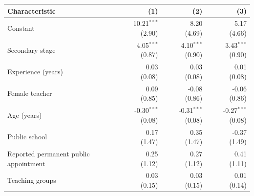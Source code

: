 \begin{tabular}{p{6.5cm}rrr}
\toprule
Characteristic & (1) & (2) & (3) \\
\midrule
Constant & \shortstack{10.21$^{***}$\\{\scriptsize (2.90)}} & \shortstack{8.20\\{\scriptsize (4.69)}} & \shortstack{5.17\\{\scriptsize (4.66)}} \\
Secondary stage & \shortstack{4.05$^{***}$\\{\scriptsize (0.87)}} & \shortstack{4.10$^{***}$\\{\scriptsize (0.90)}} & \shortstack{3.43$^{***}$\\{\scriptsize (0.90)}} \\
Experience (years) & \shortstack{0.03\\{\scriptsize (0.08)}} & \shortstack{0.03\\{\scriptsize (0.08)}} & \shortstack{0.01\\{\scriptsize (0.08)}} \\
Female teacher & \shortstack{0.09\\{\scriptsize (0.85)}} & \shortstack{-0.08\\{\scriptsize (0.86)}} & \shortstack{-0.06\\{\scriptsize (0.86)}} \\
Age (years) & \shortstack{-0.30$^{***}$\\{\scriptsize (0.08)}} & \shortstack{-0.31$^{***}$\\{\scriptsize (0.08)}} & \shortstack{-0.27$^{***}$\\{\scriptsize (0.08)}} \\
Public school & \shortstack{0.17\\{\scriptsize (1.47)}} & \shortstack{0.35\\{\scriptsize (1.47)}} & \shortstack{-0.37\\{\scriptsize (1.49)}} \\
Reported permanent public appointment & \shortstack{0.25\\{\scriptsize (1.12)}} & \shortstack{0.27\\{\scriptsize (1.12)}} & \shortstack{0.41\\{\scriptsize (1.11)}} \\
Teaching groups & \shortstack{0.03\\{\scriptsize (0.15)}} & \shortstack{0.03\\{\scriptsize (0.15)}} & \shortstack{0.01\\{\scriptsize (0.14)}} \\

\end{tabular}
